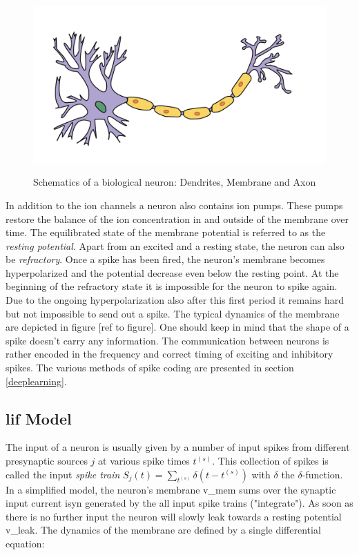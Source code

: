 \begin{figure}
	\includegraphics[width=\linewidth]{figures/neuron_model.png}
	\label{biosynapse}
	\caption{Schematics of a biological neuron: Dendrites, Membrane and Axon}
\end{figure}


In addition to the ion channels a neuron also contains ion pumps. These pumps restore the balance of the ion concentration in and outside of the membrane over time. The equilibrated state of the membrane potential is referred to as the \textit{resting potential}. Apart from an excited and a resting state, the neuron can also be \textit{refractory}. Once a spike has been fired, the neuron's membrane becomes hyperpolarized and the potential decrease even below the resting point. At the beginning of the refractory state it is impossible for the neuron to spike again. Due to the ongoing hyperpolarization also after this first period it remains hard but not impossible to send out a spike. The typical dynamics of the membrane are depicted in figure [ref to figure]. One should keep in mind that the shape of a spike doesn't carry any information.  The communication between neurons is rather encoded in the frequency and correct timing of exciting and inhibitory spikes. The various methods of spike coding are presented in section \ref{deeplearning}. 

\subsection{\gls{lif} Model}

The input of a neuron is usually given by a number of input spikes from different presynaptic sources $j$ at various spike times $t^{(s)}$. This collection of spikes is called the input \textit{spike train} $S_j(t) = \sum_{t^{(s)}} \delta(t - t^{(s)})$ with $\delta$ the $\delta$-function. In a simplified model, the neuron's membrane \gls{v_mem} sums over the synaptic input current \gls{isyn} generated by the all input spike trains ("integrate"). As soon as there is no further input the neuron will slowly leak towards a resting potential \gls{v_leak}. The dynamics of the membrane are defined by a single differential equation:

